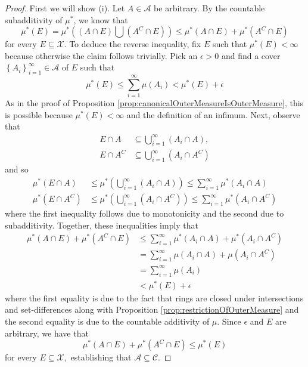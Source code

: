 \begin{proof}
First we will show (i). Let $A\in\mathcal{A}$ be arbitrary. By the
countable subadditivity of $\mu^{*}$, we know that 
\[
\mu^{*}\left(E\right)=\mu^{*}\left(\left(A\cap E\right)\bigcup\left(A^{C}\cap E\right)\right)\leq\mu^{*}\left(A\cap E\right)+\mu^{*}\left(A^{C}\cap E\right)
\]
for every $E\subseteq\mathcal{X}$. To deduce the reverse inequality,
fix $E$ such that $\mu^{*}\left(E\right)<\infty$ because otherwise
the claim follows trivially. Pick an $\epsilon>0$ and find a cover
$\left\{ A_{i}\right\} _{i=1}^{\infty}\in\mathcal{A}$ of $E$ such
that
\[
\mu^{*}\left(E\right)\leq\sum_{i=1}^{\infty}\mu\left(A_{i}\right)<\mu^{*}\left(E\right)+\epsilon
\]
As in the proof of Proposition \ref{prop:canonicalOuterMeasureIsOuterMeasure},
this is possible because $\mu^{*}\left(E\right)<\infty$ and the definition
of an infimum. Next, observe that
\begin{align*}
E\cap A & \subseteq\bigcup_{i=1}^{\infty}(A_{i}\cap A),\\
E\cap A^{C} & \subseteq\bigcup_{i=1}^{\infty}(A_{i}\cap A^{C})
\end{align*}
and so 
\begin{align*}
\mu^{*}\left(E\cap A\right) & \leq\mu^{*}\left(\bigcup_{i=1}^{\infty}(A_{i}\cap A)\right)\leq\sum_{i=1}^{\infty}\mu^{*}\left(A_{i}\cap A\right)\\
\mu^{*}\left(E\cap A^{C}\right) & \leq\mu^{*}\left(\bigcup_{i=1}^{\infty}(A_{i}\cap A^{C})\right)\leq\sum_{i=1}^{\infty}\mu^{*}\left(A_{i}\cap A^{C}\right)
\end{align*}
where the first inequality follows due to monotonicity and the second
due to subadditivity. Together, these inequalities imply that
\begin{align*}
\mu^{*}\left(A\cap E\right)+\mu^{*}\left(A^{C}\cap E\right) & \leq\sum_{i=1}^{\infty}\mu^{*}\left(A_{i}\cap A\right)+\mu^{*}\left(A_{i}\cap A^{C}\right)\\
 & =\sum_{i=1}^{\infty}\mu\left(A_{i}\cap A\right)+\mu\left(A_{i}\cap A^{C}\right)\\
 & =\sum_{i=1}^{\infty}\mu\left(A_{i}\right)\\
 & <\mu^{*}\left(E\right)+\epsilon
\end{align*}
where the first equality is due to the fact that rings are closed
under intersections and set-differences along with Proposition \ref{prop:restrictionOfOuterMeasure}
and the second equality is due to the countable additivity of $\mu.$
Since $\epsilon$ and $E$ are arbitrary, we have that 
\[
\mu^{*}\left(A\cap E\right)+\mu^{*}\left(A^{C}\cap E\right)\leq\mu^{*}\left(E\right)
\]
for every $E\subseteq\mathcal{X},$ establishing that $\mathcal{A}\subseteq\mathcal{C}$.


\end{proof}

